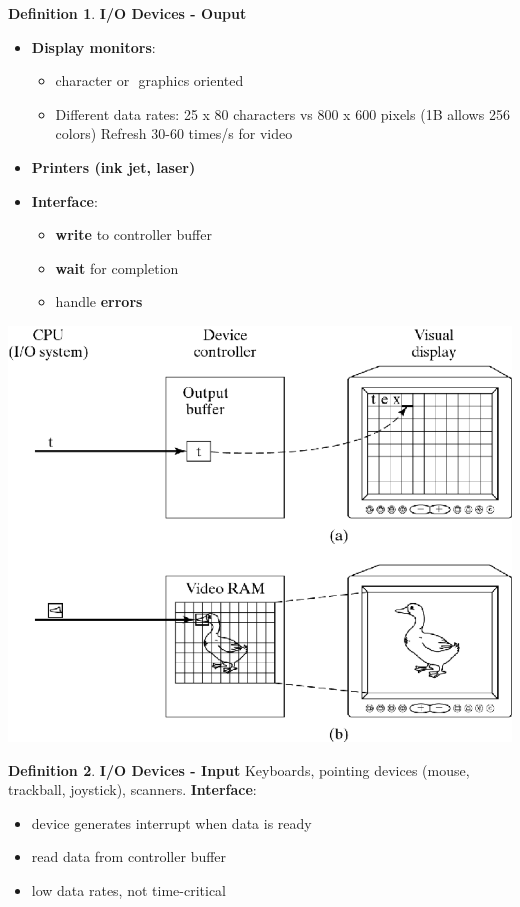 \documentclass[11pt,a4paper]{article}
\theoremstyle{definition}
\newtheorem{definition}{Definition}[section]
\newenvironment{myitemize}
{ \begin{itemize}
    \setlength{\itemsep}{5pt}
    \setlength{\parskip}{0pt}
    \setlength{\parsep}{0pt}     }
{ \end{itemize}                  }
\begin{document}
\begin{minipage}{0.35\linewidth}
	\begin{definition}{\textbf{I/O Devices - Ouput}}
		\begin{myitemize}
			\item \textbf{Display monitors}: 
			\begin{myitemize}
				\item character or  graphics oriented
				\item Different data rates: 25 x 80 characters vs 800 x 600 pixels (1B allows 256 colors) Refresh 30-60 times/s for video 
			\end{myitemize}
			\item \textbf{Printers (ink jet, laser)}
			\item \textbf{Interface}:
			\begin{myitemize}
				\item \textbf{write} to controller buffer
				\item \textbf{wait} for completion
				\item handle \textbf{errors}
			\end{myitemize}
		\end{myitemize}
	\end{definition}
\end{minipage}
\begin{minipage}{0.65\linewidth}
	\includegraphics[width=\linewidth]{m3/output}
\end{minipage}

\begin{definition}{\textbf{I/O Devices - Input}}
	Keyboards, pointing devices (mouse, trackball, joystick), scanners. \textbf{Interface}: 
	\begin{myitemize}
		\item device generates interrupt when data is ready
		\item read data from controller buffer
		\item low data rates, not time-critical
	\end{myitemize}
\end{definition}
\end{document}
